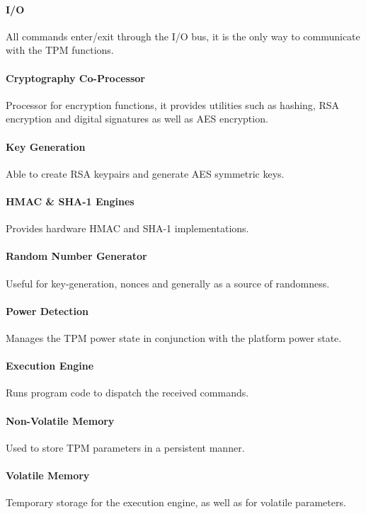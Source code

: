 \paragraph{I/O}
All commands enter/exit through the I/O bus, it is the only way to communicate with the TPM functions.
\paragraph{Cryptography Co-Processor}
Processor for encryption functions, it provides utilities such as hashing, RSA encryption and digital signatures
as well as AES encryption.
\paragraph{Key Generation}
Able to create RSA keypairs and generate AES symmetric keys.
\paragraph{HMAC \& SHA-1 Engines}
Provides hardware HMAC and SHA-1 implementations.
\paragraph{Random Number Generator}
Useful for key-generation, nonces and generally as a source of randomness.
\paragraph{Power Detection}
Manages the TPM power state in conjunction with the platform power state.
\paragraph{Execution Engine}
Runs program code to dispatch the received commands.
\paragraph{Non-Volatile Memory}
Used to store TPM parameters in a persistent manner.
\paragraph{Volatile Memory}
Temporary storage for the execution engine, as well as for volatile parameters.